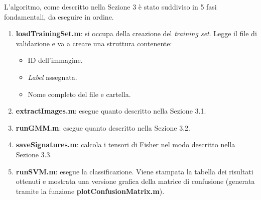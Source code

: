 L'algoritmo, come descritto nella Sezione 3 è stato suddiviso in 5 fasi fondamentali, da eseguire in ordine.

\begin{enumerate}
\item \textbf{loadTrainingSet.m}: si occupa della creazione del \emph{training set}. Legge il file di validazione e va a creare una struttura contenente:
\begin{itemize}
\item ID dell'immagine.
\item \emph{Label} assegnata.
\item Nome completo del file e cartella.
\end{itemize}
\item \textbf{extractImages.m}: esegue quanto descritto nella Sezione 3.1. 
\item \textbf{runGMM.m}: esegue quanto descritto nella Sezione 3.2.
\item \textbf{saveSignatures.m}: calcola i tensori di Fisher nel modo descritto nella Sezione 3.3.
\item \textbf{runSVM.m}: esegue la classificazione. Viene stampata la tabella dei risultati ottenuti e mostrata una versione grafica della matrice di confusione (generata tramite la funzione \textbf{plotConfusionMatrix.m}).
\end{enumerate}
